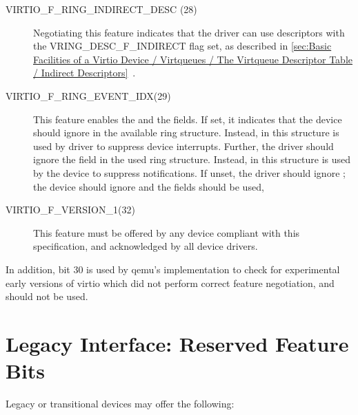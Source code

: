 \begin{description}
  \item[VIRTIO_F_RING_INDIRECT_DESC (28)] Negotiating this feature indicates
  that the driver can use descriptors with the VRING_DESC_F_INDIRECT
  flag set, as described in \ref{sec:Basic Facilities of a Virtio Device / Virtqueues / The Virtqueue Descriptor Table / Indirect Descriptors}~.

  \item[VIRTIO_F_RING_EVENT_IDX(29)] This feature enables the 
  and the  fields. If set, it indicates that the
  device should ignore  in the available ring
  structure. Instead,  in this structure is
  used by driver to suppress device interrupts. Further, the
  driver should ignore the  field in the used ring
  structure. Instead,  in this structure is
  used by the device to suppress notifications. If unset, the
  driver should ignore ; the device should
  ignore  and the  fields should be used,

  \item[VIRTIO_F_VERSION_1(32)] This feature must be offered by any device
  compliant with this specification, and acknowledged by all device
  drivers.
\end{description}

In addition, bit 30 is used by qemu's implementation to check for experimental
early versions of virtio which did not perform correct feature negotiation,
and should not be used.

\section{Legacy Interface: Reserved Feature Bits}\label{sec:Reserved Feature Bits / Legacy Interface: Reserved Feature Bits}

Legacy or transitional devices may offer the following:

